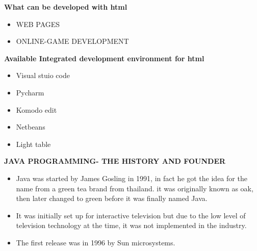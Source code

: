 \documentclass{article}
\begin{document}
   \newpage
   \maketitle \textbf{What can be developed with html}
   \begin{itemize}
     	\item WEB PAGES
	    \item ONLINE-GAME DEVELOPMENT
   \end{itemize}
\newpage
\maketitle \textbf{Available Integrated development environment for html}
\begin{itemize}
	\item Visual stuio code
    \item Pycharm
	\item Komodo edit
	\item Netbeans
	\item Light table
	
\end{itemize}
\newpage
\maketitle \textbf{JAVA PROGRAMMING- THE HISTORY AND FOUNDER}
\begin{itemize} 
	\item Java was started by James Gosling in 1991, in fact he got the idea for the name from a green tea brand from thailand. it was originally known as oak, then later changed to green before it was finally named Java.
\item It was initially set up for interactive television but due to the low level of television technology at the time, it was not implemented in the industry.
\item The first release was in 1996 by Sun microsystems.
\end{itemize}


    
    
\end{document}
